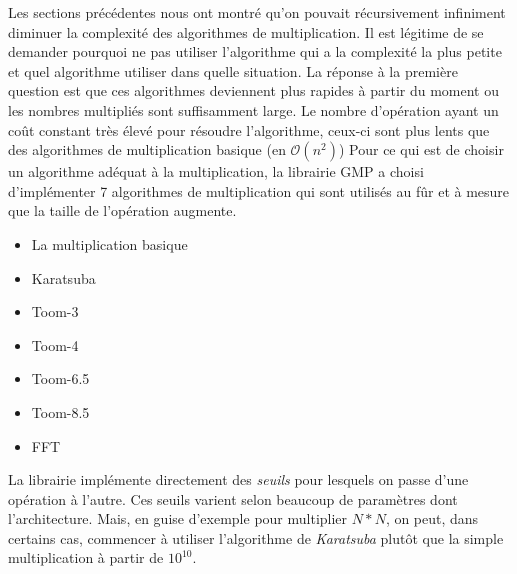 \documentclass[letterpaper]{article}
\begin{document}
Les sections précédentes nous ont montré qu'on pouvait récursivement
infiniment diminuer la complexité des algorithmes de multiplication.
Il est légitime de se demander pourquoi ne pas utiliser l'algorithme
qui a la complexité la plus petite et quel algorithme utiliser dans
quelle situation.
\newline
La réponse à la première question est que ces algorithmes deviennent
plus rapides à partir du moment ou les nombres multipliés sont
suffisamment large. Le nombre d'opération ayant un coût constant
très élevé pour résoudre l'algorithme, ceux-ci sont plus lents
que des algorithmes de multiplication basique (en $\mathcal{O}(n^2)$)
\newline
Pour ce qui est de choisir un algorithme adéquat à la multiplication,
la librairie GMP a choisi d'implémenter 7 algorithmes de multiplication
qui sont utilisés au fûr et à mesure que la taille de l'opération
augmente\cite{gmplibmultiplication}.

\begin{itemize}
  \item La multiplication basique
  \item Karatsuba
  \item Toom-3
  \item Toom-4
  \item Toom-6.5
  \item Toom-8.5
  \item FFT
\end{itemize}

La librairie implémente directement des \emph{seuils} pour lesquels
on passe d'une opération à l'autre. Ces seuils varient selon
beaucoup de paramètres dont l'architecture. Mais, en guise d'exemple
pour multiplier $N*N$, on peut, dans certains cas, commencer à utiliser
l'algorithme de \emph{Karatsuba} plutôt que la simple multiplication
à partir de $10^{10}$\cite{gmplibkaratsuba}.
\end{document}
